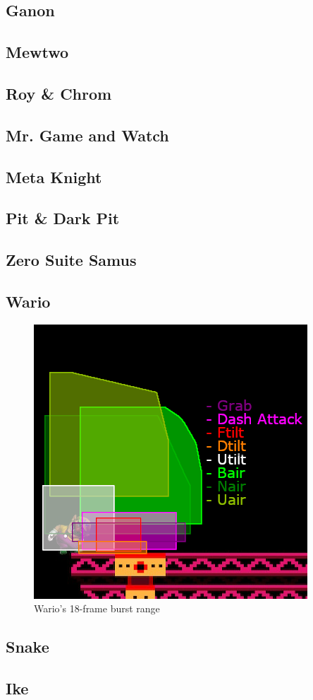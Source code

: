 \begin{multicols}{2}
\subsection{Ganon}
\subsection{Mewtwo}
\subsection{Roy \& Chrom}
\subsection{Mr. Game and Watch}
\subsection{Meta Knight}
\subsection{Pit \& Dark Pit}
\subsection{Zero Suite Samus}

\subsection{Wario}
\begin{figure}[H]
    \centering
    \includegraphics[width=.45\textwidth]{images/burst-ranges/wario}
    \caption{Wario's 18-frame burst range\cite{ref:burst-range:wario}}
\end{figure}
\subsection{Snake}
\subsection{Ike}

\end{multicols}
